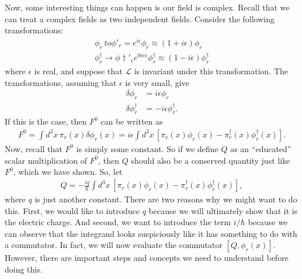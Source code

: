 \documentclass[a4paper,11pt]{article}
\numberwithin{equation}{section}
\theoremstyle{definition}
\newcommand{\lag}{\mathcal{L}}
\begin{document}
Now, some interesting things can happen is our field is complex. Recall that we can treat a complex fields as two independent fields. Consider the following transformations:
\begin{align}
\phi_r\ to \phi'_r = e^{i\epsilon}\phi_r \approx (1 + i\epsilon)\phi_r\\
\phi^\dagger_r \to \phi\dagger'_r e^{0ie\epsilon}\phi^\dagger_r \approx (1-i\epsilon)\phi^\dagger_r
\end{align}
where $\epsilon$ is real, and suppose that $\lag$ is invariant under this transformation. The transformations, assuming that $\epsilon$ is very small, give
\begin{align}
\delta \phi_r &= i\epsilon\phi_r\\
\delta \phi^\dagger_r &= -i\epsilon\phi^\dagger_r.
\end{align}
If this is the case, then $F^0$ can be written as
\begin{align}
F^0 = \int d^3x\, \pi_r(x)\delta \phi_r(x) = i\epsilon\int d^3x\, [\pi_r(x)\phi_r(x) - \pi_r^\dagger(x) \phi^\dagger_r(x)].
\end{align}
Now, recall that $F^0$ is simply some constant. So if we define $Q$ as an ``educated'' scalar multiplication of $F^0$, then $Q$ should also be a conserved quantity just like $F^0$, which we have shown. So, let 
\begin{align}
Q = -\frac{iq}{\hbar}\int d^3x\, [\pi_r(x)\phi_r(x) - \pi_r^\dagger(x) \phi^\dagger_r(x)],
\end{align}
where $q$ is just another constant. There are two reasons why we might want to do this. First, we would like to introduce $q$ because we will ultimately show that it is the electric charge. And second, we want to introduce the term $i/\hbar$ because we can observe that the integrand looks suspiciously like it has something to do with a commutator. In fact, we will now evaluate the commutator $[Q,\phi_r(x)]$. However, there are important steps and concepts we need to understand before doing this.\\
\end{document}
